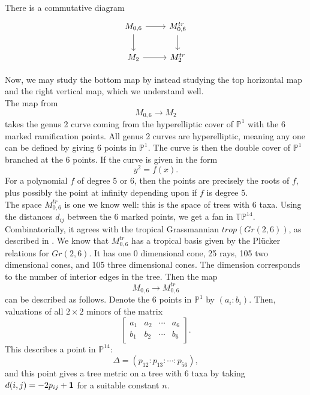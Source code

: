 \begin{theorem} There is a commutative diagram
\[
\begin{tikzcd}
M_{0,6} \arrow{r}{} \arrow[swap]{d}{} & M_{0,6}^{tr} \arrow{d}{} \\
M_2  \arrow{r}{} & M_2^{tr}
\end{tikzcd}
\]
\end{theorem}
Now, we may study the bottom map by instead studying the top horizontal map and the right vertical map, which we understand well.\\


The map from 
$$
M_{0,6} \rightarrow M_2
$$
takes the genus 2 curve coming from the hyperelliptic cover of $\mathbb{P}^1$ with the 6 marked ramification points.
All genus 2 curves are hyperelliptic, meaning any one can be defined by giving 6 points in $\mathbb{P}^1$. The curve is then the double cover of $\mathbb{P}^1$ branched at the 6 points. If the curve is given in the form
$$
y^2 = f(x).
$$
For a polynomial $f$ of degree 5 or 6, then the points are precisely the roots of $f$, plus possibly the point at infinity depending upon if $f$ is degree 5.
\\

The space $M_{0,6}^{tr}$ is one we know well: this is the space of trees with 6 taxa. Using the distances $d_{ij}$ between the 6 marked points, we get a fan in $\mathbb{TP}^{14}$. Combinatorially, it agrees with the tropical Grassmannian $trop(Gr(2,6))$, as described in \cite{tropicalbook}. We know that $M_{0,6}^{tr}$ has a tropical basis given by the Pl\"{u}cker relations for $Gr(2,6)$. It has one 0 dimensional cone, 25 rays,  105 two dimensional cones, and 105 three dimensional cones. The dimension corresponds to the number of interior edges in the tree.
Then the map
$$
M_{0,6} \rightarrow M_{0,6}^{tr}
$$
can be described as follows. Denote the 6 points in $\mathbb{P}^1$ by $(a_i: b_i)$. Then, valuations of all $2 \times 2$ minors of the matrix
$$
\begin{bmatrix}
a_1 & a_2 & \cdots & a_6 \\
b_1 & b_2 & \cdots & b_6
\end{bmatrix}.
$$
This describes a point in $\mathbb{P}^{14}$:
$$
\Delta = (p_{12}: p_{13}: \cdots: p_{56}),
$$
and this point gives a tree metric on a tree with 6 taxa by taking $d(i,j) = -2p_{ij} + \bf{1}$ for a suitable constant $n$.\\ 

